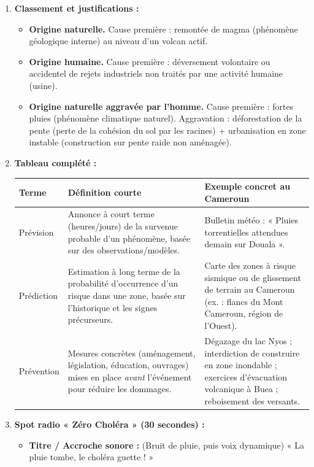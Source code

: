 \documentclass[11pt]{article}
\begin{document}
\begin{corrige}
\begin{enumerate}
\item \textbf{Classement et justifications :}
\begin{itemize}
\item[a)] \textbf{Origine naturelle.} Cause première : remontée de magma (phénomène géologique interne) au niveau d'un volcan actif.
\item[b)] \textbf{Origine humaine.} Cause première : déversement volontaire ou accidentel de rejets industriels non traités par une activité humaine (usine).
\item[c)] \textbf{Origine naturelle aggravée par l'homme.} Cause première : fortes pluies (phénomène climatique naturel). Aggravation : déforestation de la pente (perte de la cohésion du sol par les racines) + urbanisation en zone instable (construction sur pente raide non aménagée).
\end{itemize}
\item \textbf{Tableau complété :}
\begin{center}
\begin{tabularx}{\linewidth}{|l|X|X|}\hline
\textbf{Terme} & \textbf{Définition courte} & \textbf{Exemple concret au Cameroun} \\ \hline
Prévision & Annonce à court terme (heures/jours) de la survenue probable d'un phénomène, basée sur des observations/modèles. & Bulletin météo : « Pluies torrentielles attendues demain sur Douala ». \\ \hline
Prédiction & Estimation à long terme de la probabilité d'occurrence d'un risque dans une zone, basée sur l'historique et les signes précurseurs. & Carte des zones à risque sismique ou de glissement de terrain au Cameroun (ex. : flancs du Mont Cameroun, région de l'Ouest). \\ \hline
Prévention & Mesures concrètes (aménagement, législation, éducation, ouvrages) mises en place \emph{avant} l'événement pour réduire les dommages. & Dégazage du lac Nyos ; interdiction de construire en zone inondable ; exercices d'évacuation volcanique à Buea ; reboisement des versants. \\ \hline
\end{tabularx}
\end{center}
\item \textbf{Spot radio « Zéro Choléra » (30 secondes) :}
\begin{itemize}
\item \textbf{Titre / Accroche sonore :} (Bruit de pluie, puis voix dynamique) « La pluie tombe, le choléra guette ! »

\end{itemize}
\end{enumerate}
\end{corrige}
\end{document}
